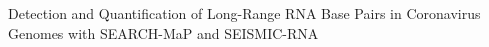 \documentclass[12pt,a4paper]{article}
\begin{document}
\sloppy

Detection and Quantification of Long-Range RNA Base Pairs in Coronavirus Genomes with SEARCH-MaP and SEISMIC-RNA

\newpage

\newpage

\newpage

\newpage

\newpage

\newpage

\begin{singlespace}
	
	
\end{singlespace}
\end{document}
